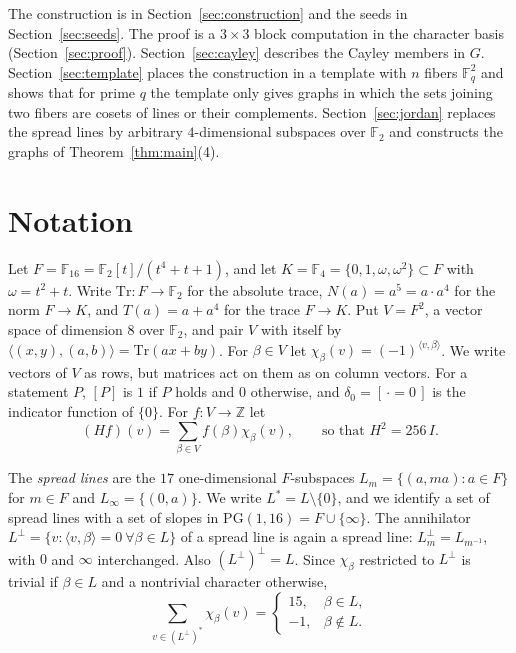 \documentclass[11pt]{amsart}
\theoremstyle{definition}
\newcommand{\F}{\mathbb{F}}
\newcommand{\PG}{\mathrm{PG}}
\newcommand{\Tr}{\mathrm{Tr}}
\begin{document}
The construction is in Section~\ref{sec:construction} and the seeds in Section~\ref{sec:seeds}. The proof is a $3\times3$ block computation in the character basis (Section~\ref{sec:proof}). Section~\ref{sec:cayley} describes the Cayley members in $G$. Section~\ref{sec:template} places the construction in a template with $n$ fibers $\F_q^2$ and shows that for prime $q$ the template only gives graphs in which the sets joining two fibers are cosets of lines or their complements. Section~\ref{sec:jordan} replaces the spread lines by arbitrary $4$-dimensional subspaces over $\F_2$ and constructs the graphs of Theorem~\ref{thm:main}(4).

\section{Notation}\label{sec:notation}

Let $F=\F_{16}=\F_2[t]/(t^4+t+1)$, and let $K=\F_4=\{0,1,\omega,\omega^2\}\subset F$ with $\omega=t^2+t$. Write $\Tr\colon F\to\F_2$ for the absolute trace, $N(a)=a^5=a\cdot a^4$ for the norm $F\to K$, and $T(a)=a+a^4$ for the trace $F\to K$. Put $V=F^2$, a vector space of dimension $8$ over $\F_2$, and pair $V$ with itself by $\langle (x,y),(a,b)\rangle=\Tr(ax+by)$. For $\beta\in V$ let $\chi_\beta(v)=(-1)^{\langle v,\beta\rangle}$. We write vectors of $V$ as rows, but matrices act on them as on column vectors. For a statement $P$, $[P]$ is $1$ if $P$ holds and $0$ otherwise, and $\delta_0=[\,\cdot=0\,]$ is the indicator function of $\{0\}$. For $f\colon V\to\mathbb{Z}$ let
\[
(Hf)(v)=\sum_{\beta\in V} f(\beta)\chi_\beta(v),\qquad\text{so that } H^2=256\,I.
\]

The \emph{spread lines} are the $17$ one-dimensional $F$-subspaces $L_m=\{(a,ma):a\in F\}$ for $m\in F$ and $L_\infty=\{(0,a)\}$. We write $L^*=L\setminus\{0\}$, and we identify a set of spread lines with a set of slopes in $\PG(1,16)=F\cup\{\infty\}$. The annihilator $L^\perp=\{v:\langle v,\beta\rangle=0\ \forall\beta\in L\}$ of a spread line is again a spread line: $L_m^\perp=L_{m^{-1}}$, with $0$ and $\infty$ interchanged. Also $(L^\perp)^\perp=L$. Since $\chi_\beta$ restricted to $L^\perp$ is trivial if $\beta\in L$ and a nontrivial character otherwise,
\begin{equation}\label{eq:line}
\sum_{v\in (L^\perp)^*}\chi_\beta(v)=\begin{cases}15,&\beta\in L,\\-1,&\beta\notin L.\end{cases}
\end{equation}
\end{document}
